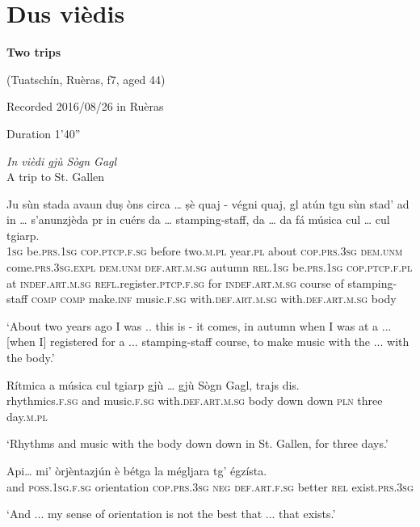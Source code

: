 \section{Dus vièdis}

\noindent
\textbf{Two trips}

\noindent
(Tuatschín, Ruèras, f7, aged 44)

\noindent
Recorded 2016/08/26 in Ruèras

\noindent
Duration 1'40''

\bigskip

\textit{In vièdi gjù Sògn Gagl}\\
A trip to St. Gallen\\
\smallskip


\begin{linenumbers}
	\gll Ju sùn stada avaun duṣ òns circa … ṣè quaj - végni quaj, gl atún tgu sùn stad' ad in …  s'anunzjèda pr in cuérs da … stamping-staff, da … da fá música cul … cul tgiarp.   \\
	\textsc{1sg} be.\textsc{prs.1sg} \textsc{cop.ptcp.f.sg} before two.\textsc{m.pl} year.\textsc{pl} about {} \textsc{cop.prs.3sg} \textsc{dem.unm} {} come.\textsc{prs.3sg.expl} \textsc{dem.unm} \textsc{def.art.m.sg} autumn \textsc{rel.1sg} be.\textsc{prs.1sg} \textsc{cop.ptcp.f.pl} at \textsc{indef.art.m.sg} {} \textsc{refl}.register.\textsc{ptcp.f.sg} for \textsc{indef.art.m.sg} course of {} stamping-staff \textsc{comp} {} \textsc{comp} make.\textsc{inf} music.\textsc{f.sg} with.\textsc{def.art.m.sg} {} with.\textsc{def.art.m.sg} body  \\
\end{linenumbers}
\medskip
\glt `About two years ago I was .. this is - it comes, in autumn when I was at a ... [when I] registered for a ... stamping-staff course, to make music with the ... with the body.'
\medskip

\begin{linenumbers}
	\gll  Rítmica a música cul tgiarp gjù … gjù Sògn Gagl, trajs dis.  \\
	rhythmics.\textsc{f.sg} and music.\textsc{f.sg} with.\textsc{def.art.m.sg} body down down \textsc{pln} {} three day.\textsc{m.pl}\\
\end{linenumbers}
\medskip
\glt `Rhythms and music with the body down {} down in St. Gallen, for three days.'
\medskip

\begin{linenumbers}
	\gll Api… mi’ òrjèntazjún è bétga la mégljara tg’ égzísta.   \\
	and \textsc{poss.1sg.f.sg} orientation \textsc{cop.prs.3sg} \textsc{neg} \textsc{def.art.f.sg} better \textsc{rel} exist.\textsc{prs.3sg}\\
\end{linenumbers}
\medskip
\glt `And ... my sense of orientation is not the best that ... that exists.'
\medskip

